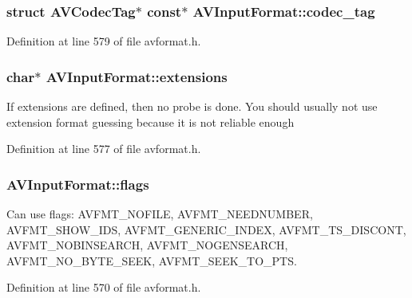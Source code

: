 \subsubsection[{\texorpdfstring{codec\+\_\+tag}{codec_tag}}]{ struct A\+V\+Codec\+Tag$\ast$ {\bf const}$\ast$ A\+V\+Input\+Format\+::codec\+\_\+tag}\hypertarget{struct_a_v_input_format_a88738bb721c18df24fb4207aa2d4924a}{}\label{struct_a_v_input_format_a88738bb721c18df24fb4207aa2d4924a}


Definition at line 579 of file avformat.\+h.

\subsubsection[{\texorpdfstring{extensions}{extensions}}]{ char$\ast$ A\+V\+Input\+Format\+::extensions}\hypertarget{struct_a_v_input_format_ae692e27e532f664f26e2501967b09eab}{}\label{struct_a_v_input_format_ae692e27e532f664f26e2501967b09eab}
If extensions are defined, then no probe is done. You should usually not use extension format guessing because it is not reliable enough 

Definition at line 577 of file avformat.\+h.

\subsubsection[{\texorpdfstring{flags}{flags}}]{ A\+V\+Input\+Format\+::flags}\hypertarget{struct_a_v_input_format_a1b30f6647d0c2faf38ba8786d7c3a838}{}\label{struct_a_v_input_format_a1b30f6647d0c2faf38ba8786d7c3a838}
Can use flags\+: A\+V\+F\+M\+T\+\_\+\+N\+O\+F\+I\+LE, A\+V\+F\+M\+T\+\_\+\+N\+E\+E\+D\+N\+U\+M\+B\+ER, A\+V\+F\+M\+T\+\_\+\+S\+H\+O\+W\+\_\+\+I\+DS, A\+V\+F\+M\+T\+\_\+\+G\+E\+N\+E\+R\+I\+C\+\_\+\+I\+N\+D\+EX, A\+V\+F\+M\+T\+\_\+\+T\+S\+\_\+\+D\+I\+S\+C\+O\+NT, A\+V\+F\+M\+T\+\_\+\+N\+O\+B\+I\+N\+S\+E\+A\+R\+CH, A\+V\+F\+M\+T\+\_\+\+N\+O\+G\+E\+N\+S\+E\+A\+R\+CH, A\+V\+F\+M\+T\+\_\+\+N\+O\+\_\+\+B\+Y\+T\+E\+\_\+\+S\+E\+EK, A\+V\+F\+M\+T\+\_\+\+S\+E\+E\+K\+\_\+\+T\+O\+\_\+\+P\+TS. 

Definition at line 570 of file avformat.\+h.

